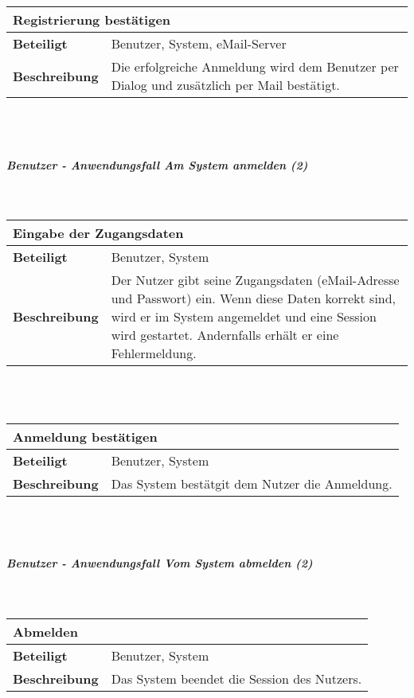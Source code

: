 \documentclass[12pt,a4paper]{article}
\begin{document}
\begin{tabular}{l p{10cm}}
\multicolumn{2}{l}{\textbf{Registrierung bestätigen}} \\ \hline
\textbf{Beteiligt} & Benutzer, System, eMail-Server \\ \hline 
\textbf{Beschreibung} & Die erfolgreiche Anmeldung wird dem Benutzer per Dialog und zusätzlich per Mail bestätigt.\\ 
\hline 
\end{tabular}\\\\
\subparagraph{Benutzer - Anwendungsfall \glqq Am System anmelden \grqq (2)}\mbox{}\\

\begin{tabular}{l p{10cm}}
\multicolumn{2}{l}{\textbf{Eingabe der Zugangsdaten}} \\ \hline
\textbf{Beteiligt} & Benutzer, System \\ \hline 
\textbf{Beschreibung} & Der Nutzer gibt seine Zugangsdaten (eMail-Adresse und Passwort) ein. Wenn diese Daten korrekt sind, wird er im System angemeldet und eine Session wird gestartet. Andernfalls erhält er eine Fehlermeldung.\\ 
\hline 
\end{tabular}\\\\

\begin{tabular}{l p{10cm}}
\multicolumn{2}{l}{\textbf{Anmeldung bestätigen}} \\ \hline
\textbf{Beteiligt} & Benutzer, System \\ \hline 
\textbf{Beschreibung} & Das System bestätgit dem Nutzer die Anmeldung.\\ 
\hline 
\end{tabular}\\\\
\subparagraph{Benutzer - Anwendungsfall \glqq Vom System abmelden \grqq (2)}\mbox{}\\

\begin{tabular}{l p{10cm}}
\multicolumn{2}{l}{\textbf{Abmelden}} \\ \hline
\textbf{Beteiligt} & Benutzer, System \\ \hline 
\textbf{Beschreibung} & Das System beendet die Session des Nutzers.\\ 
\hline 
\end{tabular}\\\\
\end{document}
